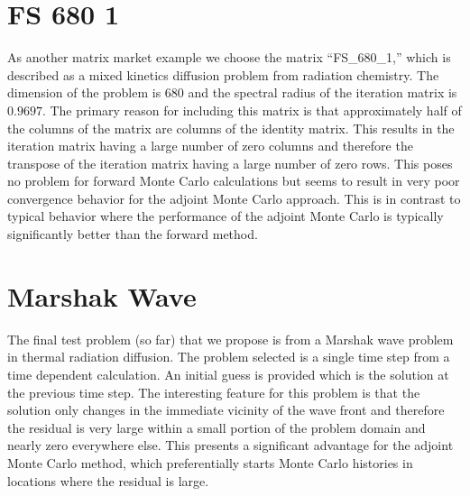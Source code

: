 \documentclass{article}
\begin{document}
\section{FS 680 1}

As another matrix market example we choose the matrix ``FS\_680\_1,''
which is described as a mixed kinetics diffusion problem from radiation chemistry.
The dimension of the problem is 680 and the spectral radius of the iteration matrix
is $0.9697$.  The primary reason for including this matrix is that approximately
half of the columns of the matrix are columns of the identity matrix.  This
results in the iteration matrix having a large number of zero columns and
therefore the transpose of the iteration matrix having a large number of 
zero rows.  This poses no problem for forward Monte Carlo calculations but
seems to result in very poor convergence behavior for the adjoint Monte Carlo
approach.  This is in contrast to typical behavior where the performance of
the adjoint Monte Carlo is typically significantly better than the forward
method.

\section{Marshak Wave}

The final test problem (so far) that we propose is from a Marshak wave problem
in thermal radiation diffusion.  The problem selected is a single time step
from a time dependent calculation.  An initial guess is provided which is the
solution at the previous time step.  The interesting feature for this problem
is that the solution only changes in the immediate vicinity of the wave front
and therefore the residual is very large within a small portion of the problem
domain and nearly zero everywhere else.  This presents a significant advantage
for the adjoint Monte Carlo method, which preferentially starts Monte Carlo
histories in locations where the residual is large.
\end{document}
